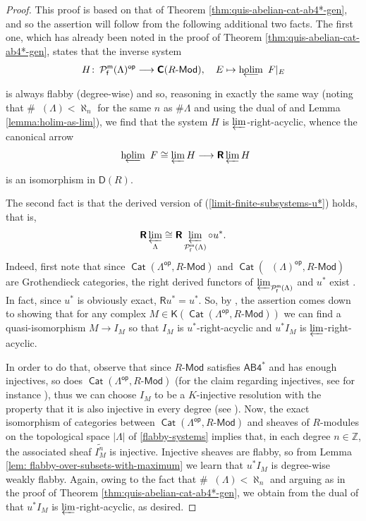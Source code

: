 \documentclass[reqno,11pt]{amsart}
\theoremstyle{plain}
\theoremstyle{remark}
\theoremstyle{definition}
\numberwithin{equation}{thm}
\newcommand{\CP}{\mathcal{P}}
\newcommand{\CCC}{\boldsymbol{\mathsf{C}}}
\newcommand{\D}{\boldsymbol{\mathsf{D}}}
\newcommand{\K}{\boldsymbol{\mathsf{K}}}
\newcommand{\R}{\boldsymbol{\mathsf{R}}}
\newcommand{\ZZ}{\mathbb{Z}}
\newcommand{\holim}[1]{\begin{array}[t]{c} {\rm holim}\\[-7.5 pt]
		{\longleftarrow} \end{array}}
\newcommand{\lto}{\longrightarrow}
\newcommand{\md}{\text{-}\mathsf{Mod}}
\newcommand{\op}{\mathsf{op}}
\DeclareMathOperator{\cat}{\mathsf{Cat}}
\DeclareMathOperator{\pfinmax}{\CP_{\mathsf{f}}^{\mathsf{m}}}
\begin{document}
	\begin{proof}
		This proof is based on that of Theorem \ref{thm:quis-abelian-cat-ab4*-gen}, and so the assertion will follow from the following additional two facts. The first one, which has already been noted in the proof of Theorem \ref{thm:quis-abelian-cat-ab4*-gen}, states that the inverse system 
		\[
			H \colon \pfinmax(\Lambda)^\op \lto \CCC(R\md), \quad E \mapsto \!\!\!\holim{} F\vert_E
		\]
		is always flabby (degree-wise) and so, reasoning in exactly the same way (noting that $\#\pfinmax(\Lambda) < \aleph_n$ for the same $n$ as $\#\Lambda$ and using the dual of \cite[Proposition 2.7.5.]{yellow} and Lemma \ref{lemma:holim-as-lim}), we find that the system $H$ is $\varprojlim$-right-acyclic, whence the canonical arrow
		\begin{equation}\label{holim-iso-rlimH}
			\holim{} F \cong \varprojlim H \lto \R\varprojlim H
		\end{equation}
		is an isomorphism in $\D(R)$.
		
		The second fact is that the derived version of (\ref{limit-finite-subsystems-u*}) holds, that is,
		\[
			\R\varprojlim_{\Lambda} \cong \R\varprojlim_{\pfinmax(\Lambda)} \circ u^*.
		\]
		Indeed, first note that since $\cat(\Lambda^\op, R\md)$ and $\cat(\pfinmax(\Lambda)^\op,R\md)$ are Grothendieck categories, the right derived functors of $\varprojlim_{\pfinmax(\Lambda)}$ and $u^*$ exist \cite[Theorem 5.4.]{AJS}. In fact, since $u^*$ is obviously exact, $\R u^*=u^*$. So, by \cite[Corollary 2.2.7.]{yellow}, the assertion comes down to showing that for any complex $M \in \K(\cat(\Lambda^\op, R\md))$ we can find a quasi-isomorphism $M \to I_M$ so that $I_M$ is $u^*$-right-acyclic and $u^*I_M$ is $\varprojlim$-right-acyclic. 
		
		In order to do that, observe that since $R\md$ satisfies $\mathsf{AB4^*}$ and has enough injectives, so does $\cat(\Lambda^\op, R\md)$ (for the claim regarding injectives, see for instance \cite[Lemma A.4.3.]{Ntc}), thus we can choose $I_M$ to be a $K$-injective resolution with the property that it is also injective in every degree (see \cite[Application 2.4.]{BN}). Now, the exact isomorphism of categories between $\cat(\Lambda^\op,R\md)$ and sheaves of $R$-modules on the topological space $|\Lambda|$ of \ref{flabby-systems} implies that, in each degree $n \in \ZZ$, the associated sheaf $\widetilde{I_M^n}$ is injective. Injective sheaves are flabby, so from Lemma \ref{lem: flabby-over-subsets-with-maximum} we learn that $u^*I_M$ is degree-wise weakly flabby. Again, owing to the fact that $\#\pfinmax(\Lambda) < \aleph_n$ and arguing as in the proof of Theorem \ref{thm:quis-abelian-cat-ab4*-gen}, we obtain from the dual of \cite[Proposition 2.7.5.]{yellow} that $u^*I_M$ is $\varprojlim$-right-acyclic, as desired.
		

\end{proof}
\end{document}

